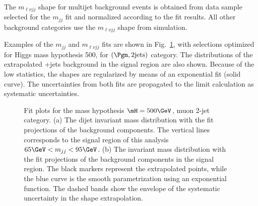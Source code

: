 The $m_{\ell\nu jj}$ shape for multijet background events is obtained
from data sample selected for the
$m_{jj}$ fit and normalized according to the fit results.
All other background categories use the $m_{\ell\nu{}jj}$ shape
from simulation.

Examples of the $m_{jj}$ and $m_{\ell\nu jj}$ fits are shown in
Fig.~\ref{fig:lvjjfits}, with selections optimized for Higgs mass
hypothesis 500\GeV, for $(\Pgm,2\rm{jets})$ category.  The distributions of
the extrapolated \PW+jets background in the signal region are also
shown.  Because of the low statistics, the shapes are regularized by
means of an exponential fit (solid curve). The uncertainties from both
fits are propagated to the limit calculation as systematic
uncertainties.

\begin{figure}[htbp]
  \centering
  \caption{\label{fig:lvjjfits} Fit plots for the mass hypothesis
    $\mH=500\GeV$, muon 2-jet category.  (a) The dijet invariant mass
    distribution with the fit projections of the background components.
    The vertical lines corresponds to the signal region of this analysis
    $65\GeV < m_{jj}
    < 95\GeV$.  %
    (b) The \WW invariant mass distribution with the fit projections of
    the background components in the signal region.
    The black markers represent the
    extrapolated points, while the blue curve is the smooth
    parametrization using an exponential function.  The dashed bands
    show the envelope of the systematic uncertainty in the shape
    extrapolation. }
\end{figure}


